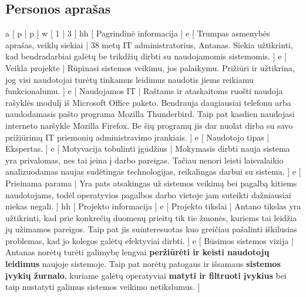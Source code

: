 \subsection{Personos aprašas}
\xtableu
{
  a [ p | p ]
  w [ 1 | 3 ]
  hh [ Pagrindinė informacija ]
  e [ Trumpas asmenybės aprašas, veiklų siekiai
  |
    38 metų IT administratorius, Antanas. Siekia užtikrinti, kad
    bendradarbiai galėtų be trikdžių dirbti su naudojamomis
    sistemomis.
  ]
  e [ Veikla projekte
  |
    Rūpinasi sistemos veikimu, jos palaikymu. Prižiūri ir užtikrina, jog visi naudotojai
    turėtų tinkamus leidimus naudotis jiems reikiamu funkcionalumu.
  ]
  e [ Naudojamos IT
  |
    Raštams ir ataskaitoms ruošti naudoja rašyklės modulį iš
    Microsoft Office paketo. Bendrauja daugiausiai telefonu arba
    naudodamasis pašto programa Mozilla Thunderbird. Taip pat kasdien
    naudojasi interneto naršykle Mozilla Firefox. Be šių programų
    jis dar nuolat dirba su savo prižiūrimų IT priemonių administravimo 
    įrankiais.
  ]
  e [ Naudotojo tipas
  |
    Ekspertas.
  ]
  e [ Motyvacija tobulinti įgūdžius
  |
    Mokymasis dirbti nauja sistema yra privalomas, nes tai įeina į darbo pareigas. Tačiau nenori
    leisti laisvalaikio analizuodamas naujas sudėtingas technologijas, reikalingas darbui su sistema.
  ]
  e [ Prieinama parama
  |
    Yra pats atsakingas už sistemos veikimą bei pagalbą kitiems naudotojams, todėl operatyvios pagalbos
    darbo vietoje jam suteikti dažniausiai niekas negali.
  ]
  hh [ Projekto informacija ]
  e [ Projekto tikslai
  |
    Antano tikslas yra užtikrinti, kad prie konkrečių duomenų prieitų
    tik tie žmonės, kuriems tai leidžia jų užimamos pareigos. Taip
    pat jis suinteresuotas kuo greičiau pašalinti iškilusias problemas,
    kad jo kolegos galėtų efektyviai dirbti.
  ]
  e [ Būsimos sistemos vizija
  |
    Antanas norėtų turėti galimybę lengvai \textbf{peržiūrėti ir
    keisti naudotojų leidimus} naujoje sistemoje. Taip pat norėtų
    patogaus ir išsamaus \textbf{sistemos įvykių žurnalo}, kuriame
    galėtų operatyviai \textbf{matyti ir filtruoti įvykius} bei taip
    nustatyti galimus sistemos veikimo netikslumus.
  ]
}

\newpage
